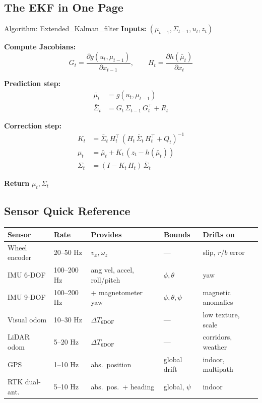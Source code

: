 \documentclass[11pt,a4paper]{article}
\begin{document}
\subsection{The EKF in One Page}

\begin{algobox}{Algorithm: Extended\_Kalman\_filter}
\textbf{Inputs:} $(\mu_{t-1}, \Sigma_{t-1}, u_t, z_t)$


\textbf{Compute Jacobians:}
\[
G_t = \frac{\partial g(u_t, \mu_{t-1})}{\partial x_{t-1}}, \qquad H_t = \frac{\partial h(\bar{\mu}_t)}{\partial x_t}
\]

\textbf{Prediction step:}
\begin{align*}
\bar{\mu}_t &= g(u_t, \mu_{t-1}) \\
\bar{\Sigma}_t &= G_t\, \Sigma_{t-1}\, G_t^\top + R_t
\end{align*}

\textbf{Correction step:}
\begin{align*}
K_t &= \bar{\Sigma}_t\, H_t^\top\,(H_t\, \bar{\Sigma}_t\, H_t^\top + Q_t)^{-1} \\
\mu_t &= \bar{\mu}_t + K_t\,(z_t - h(\bar{\mu}_t)) \\
\Sigma_t &= (I - K_t\, H_t)\,\bar{\Sigma}_t
\end{align*}

\textbf{Return} $\mu_t, \Sigma_t$
\end{algobox}

\subsection{Sensor Quick Reference}

\begin{center}
\footnotesize
\begin{tabular}{lllll}
\toprule
\textbf{Sensor} & \textbf{Rate} & \textbf{Provides} & \textbf{Bounds} & \textbf{Drifts on} \\
\midrule
Wheel encoder & 20--50 Hz & $v_x, \omega_z$ & --- & slip, $r$/$b$ error\\
IMU 6-DOF & 100--200 Hz & ang vel, accel, roll/pitch & $\phi, \theta$ & yaw\\
IMU 9-DOF & 100--200 Hz & + magnetometer yaw & $\phi, \theta, \psi$ & magnetic anomalies\\
Visual odom & 10--30 Hz & $\Delta T_{6\text{DOF}}$ & --- & low texture, scale\\
LiDAR odom & 5--20 Hz & $\Delta T_{6\text{DOF}}$ & --- & corridors, weather \\
GPS & 1--10 Hz & abs.\ position & global drift & indoor, multipath\\
RTK dual-ant. & 5--10 Hz & abs.\ pos.\ + heading & global, $\psi$ & indoor\\
\bottomrule
\end{tabular}
\end{center}
\end{document}
